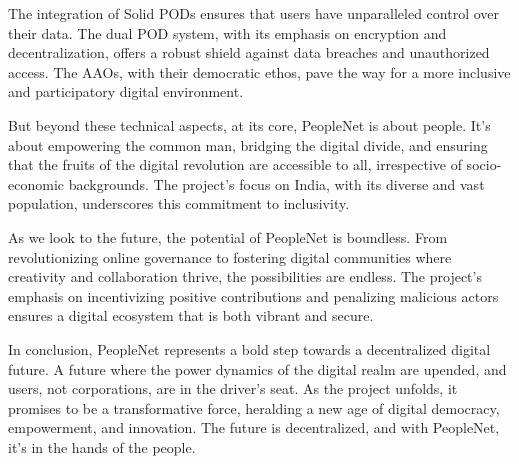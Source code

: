 \documentclass[10pt]{article}
\begin{document}
The integration of Solid PODs ensures that users have unparalleled control over their data. The dual POD system, with its emphasis on encryption and decentralization, offers a robust shield against data breaches and unauthorized access. The AAOs, with their democratic ethos, pave the way for a more inclusive and participatory digital environment.

But beyond these technical aspects, at its core, PeopleNet is about people. It's about empowering the common man, bridging the digital divide, and ensuring that the fruits of the digital revolution are accessible to all, irrespective of socio-economic backgrounds. The project's focus on India, with its diverse and vast population, underscores this commitment to inclusivity.

As we look to the future, the potential of PeopleNet is boundless. From revolutionizing online governance to fostering digital communities where creativity and collaboration thrive, the possibilities are endless. The project's emphasis on incentivizing positive contributions and penalizing malicious actors ensures a digital ecosystem that is both vibrant and secure.

In conclusion, PeopleNet represents a bold step towards a decentralized digital future. A future where the power dynamics of the digital realm are upended, and users, not corporations, are in the driver's seat. As the project unfolds, it promises to be a transformative force, heralding a new age of digital democracy, empowerment, and innovation. The future is decentralized, and with PeopleNet, it's in the hands of the people.
\end{document}
